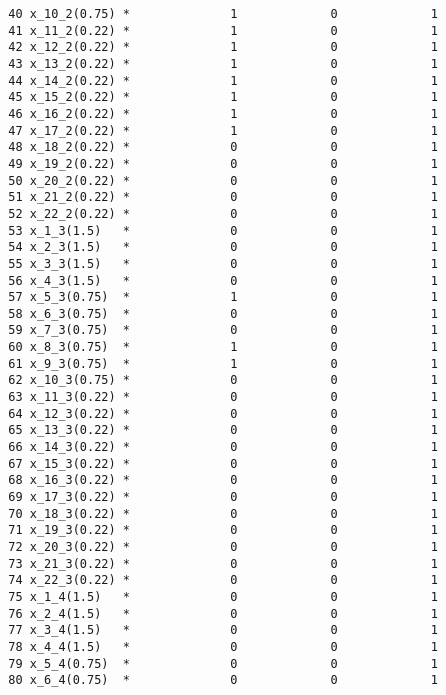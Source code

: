 \documentclass{article}[A4]
\begin{document}
\begin{verbatim}
		40 x_10_2(0.75) *              1             0             1 
		41 x_11_2(0.22) *              1             0             1 
		42 x_12_2(0.22) *              1             0             1 
		43 x_13_2(0.22) *              1             0             1 
		44 x_14_2(0.22) *              1             0             1 
		45 x_15_2(0.22) *              1             0             1 
		46 x_16_2(0.22) *              1             0             1 
		47 x_17_2(0.22) *              1             0             1 
		48 x_18_2(0.22) *              0             0             1 
		49 x_19_2(0.22) *              0             0             1 
		50 x_20_2(0.22) *              0             0             1 
		51 x_21_2(0.22) *              0             0             1 
		52 x_22_2(0.22) *              0             0             1 
		53 x_1_3(1.5)   *              0             0             1 
		54 x_2_3(1.5)   *              0             0             1 
		55 x_3_3(1.5)   *              0             0             1 
		56 x_4_3(1.5)   *              0             0             1 
		57 x_5_3(0.75)  *              1             0             1 
		58 x_6_3(0.75)  *              0             0             1 
		59 x_7_3(0.75)  *              0             0             1 
		60 x_8_3(0.75)  *              1             0             1 
		61 x_9_3(0.75)  *              1             0             1 
		62 x_10_3(0.75) *              0             0             1 
		63 x_11_3(0.22) *              0             0             1 
		64 x_12_3(0.22) *              0             0             1 
		65 x_13_3(0.22) *              0             0             1 
		66 x_14_3(0.22) *              0             0             1 
		67 x_15_3(0.22) *              0             0             1 
		68 x_16_3(0.22) *              0             0             1 
		69 x_17_3(0.22) *              0             0             1 
		70 x_18_3(0.22) *              0             0             1 
		71 x_19_3(0.22) *              0             0             1 
		72 x_20_3(0.22) *              0             0             1 
		73 x_21_3(0.22) *              0             0             1 
		74 x_22_3(0.22) *              0             0             1 
		75 x_1_4(1.5)   *              0             0             1 
		76 x_2_4(1.5)   *              0             0             1 
		77 x_3_4(1.5)   *              0             0             1 
		78 x_4_4(1.5)   *              0             0             1 
		79 x_5_4(0.75)  *              0             0             1 
		80 x_6_4(0.75)  *              0             0             1 

\end{verbatim}
\end{document}

